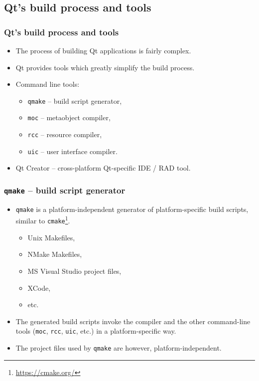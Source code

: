 \subsection{Qt's build process and tools}
\begin{frame}
  \frametitle{Qt's build process and tools}
  \begin{itemize}
    \item The process of building Qt applications is fairly complex.
    \item Qt provides tools which greatly simplify the build process.
    \item Command line tools:
      \begin{itemize}
        \item \texttt{qmake} -- build script generator,
        \item \texttt{moc} -- metaobject compiler,
        \item \texttt{rcc} -- resource compiler, 
        \item \texttt{uic} -- user interface compiler.
      \end{itemize}
    \item Qt Creator -- cross-platform Qt-specific IDE / RAD tool.
  \end{itemize}
\end{frame}

\begin{frame}
  \frametitle{\texttt{qmake} -- build script generator}
  \begin{itemize}
    \item \texttt{qmake} is a platform-independent generator of platform-specific
      build scripts, similar to \texttt{cmake}\footnote{\url{https://cmake.org/}}.
      \begin{itemize}
        \item Unix Makefiles,
        \item NMake Makefiles,
        \item MS Visual Studio project files,
        \item XCode,
        \item etc.
      \end{itemize}
    \item The generated build scripts invoke the compiler and the other
      command-line tools (\texttt{moc}, \texttt{rcc}, \texttt{uic}, etc.)
      in a platform-specific way.
    \item The project files used by \texttt{qmake} are however,
      platform-independent.
  \end{itemize}
\end{frame}


